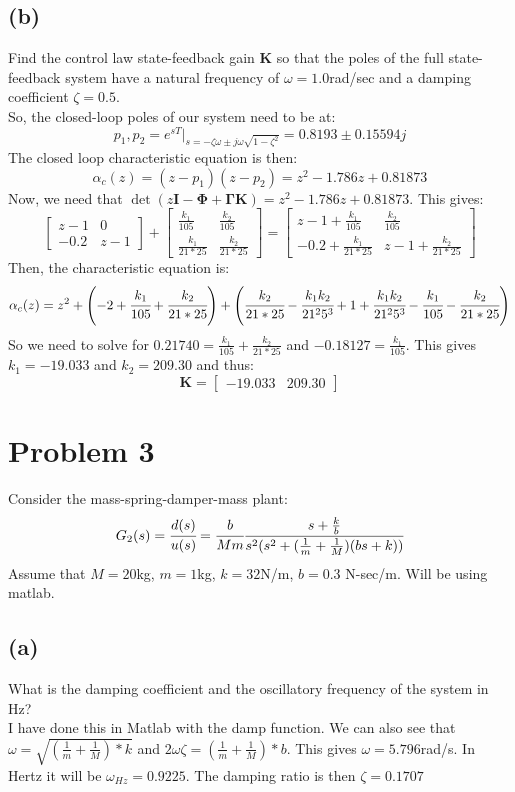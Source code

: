 \documentclass{article}
\begin{document}
\subsection*{(b)}
Find the control law state-feedback gain $\pmb{K}$ so that the poles of the full state-feedback system have a natural frequency of $\omega=1.0$rad/sec and a damping coefficient $\zeta=0.5$.\\
So, the closed-loop poles of our system need to be at:
\[p_1,p_2=e^{sT}\bigg|_{s=-\zeta\omega\pm j\omega\sqrt{1-\zeta^2}}=0.8193\pm 0.15594j\]
The closed loop characteristic equation is then:
\[\alpha_c(z)=(z-p_1)(z-p_2)=z^2-1.786z+0.81873\]
Now, we need that $\det(z\pmb{I}-\pmb{\Phi}+\pmb{\Gamma}\pmb{K})=z^2-1.786z+0.81873$. This gives:
\[\begin{bmatrix}z-1&0\\-0.2&z-1\end{bmatrix}+\begin{bmatrix}\frac{k_1}{105}&\frac{k_2}{105}\\[0.3em]\frac{k_1}{21*25}&\frac{k_2}{21*25}\end{bmatrix}=\begin{bmatrix}z-1+\frac{k_1}{105}&\frac{k_2}{105}\\[0.3em]-0.2+\frac{k_1}{21*25}&z-1+\frac{k_2}{21*25}\end{bmatrix}\]
Then, the characteristic equation is:
\[\alpha_c(z)=z^2+\left(-2+\cfrac{k_1}{105}+\cfrac{k_2}{21*25}\right)+\left (\cfrac{k_2}{21*25}-\cfrac{k_1k_2}{21^25^3}+1+\cfrac{k_1k_2}{21^25^3}-\cfrac{k_1}{105}-\cfrac{k_2}{21*25}\right )\]
So we need to solve for $0.21740=\frac{k_1}{105}+\frac{k_2}{21*25}$ and $-0.18127=\frac{k_1}{105}$. This gives $k_1=-19.033$ and $k_2=209.30$ and thus:
\[\pmb{K}=\begin{bmatrix}-19.033 &209.30\end{bmatrix}\]

\section*{Problem 3}
Consider the mass-spring-damper-mass plant:
\[G_2(s)=\cfrac{d(s)}{u(s)}=\cfrac{b}{Mm}\cfrac{s+\frac{k}{b}}{s^2(s^2+(\frac{1}{m}+\frac{1}{M})(bs+k))}\]
Assume that $M=20$kg, $m=1$kg, $k=32$N/m, $b=0.3$ N-sec/m. Will be using matlab.
\subsection*{(a)}
What is the damping coefficient and the oscillatory frequency of the system in Hz?\\
I have done this in Matlab with the damp function. We can also see that $\omega=\sqrt{(\frac{1}{m}+\frac{1}{M})*k}$ and $2\omega\zeta=(\frac{1}{m}+\frac{1}{M})*b$. This gives $\omega=5.796$rad/s. In Hertz it will be $\omega_{Hz}=0.9225$. The damping ratio is then $\zeta=0.1707$
\end{document}

